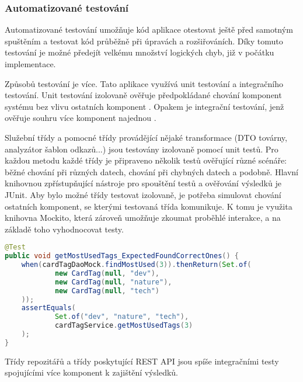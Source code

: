 
		\subsubsection{Automatizované testování}

		Automatizované testování umožňuje kód aplikace otestovat ještě před samotným spuštěním a testovat
		kód průběžně při úpravách a rozšiřováních.
		Díky tomuto testování je možné předejít velkému množství logických chyb, již v počátku implementace.

		Způsobů testování je více.
		Tato aplikace využívá unit testování a integračního testování.
		Unit testování izolovaně ověřuje předpokládané chování komponent systému bez vlivu
		ostatních komponent \cite{unit_testing}.
		Opakem je integrační testování, jenž ověřuje souhru více komponent najednou \cite{integration_testing}.

		Služební třídy a pomocné třídy provádějící nějaké transformace (\ac{DTO} továrny, analyzátor šablon odkazů...)
		jsou testovány izolovaně pomocí unit testů.
		Pro každou metodu každé třídy je připraveno několik testů ověřující různé scénáře: běžné chování při různých datech,
		chování při chybných datech a podobně.
		Hlavní knihovnou zpřístupňující nástroje pro spouštění testů a ověřování výsledků je JUnit.
		Aby bylo možné třídy testovat izolovaně, je potřeba simulovat chování ostatních komponent, se kterými testovaná
		třída komunikuje.
		K tomu je využita knihovna Mockito, která zároveň umožňuje zkoumat proběhlé interakce, a na základě toho vyhodnocovat testy.

		\begin{lstlisting}[language=Java, caption={Testu ověřující, že služba štítků vrací správné nejvyužívanější štítky z nasimulovaného repozitáře. Zdroj: [autor]}]
@Test
public void getMostUsedTags_ExpectedFoundCorrectOnes() {
	when(cardTagDaoMock.findMostUsed(3)).thenReturn(Set.of(
			new CardTag(null, "dev"),
			new CardTag(null, "nature"),
			new CardTag(null, "tech")
	));
	assertEquals(
			Set.of("dev", "nature", "tech"),
			cardTagService.getMostUsedTags(3)
	);
}
		\end{lstlisting}

		Třídy repozitářů a třídy poskytující \ac{REST} \ac{API} jsou spíše integračními testy spojujícími více
		komponent k zajištění výsledků.

